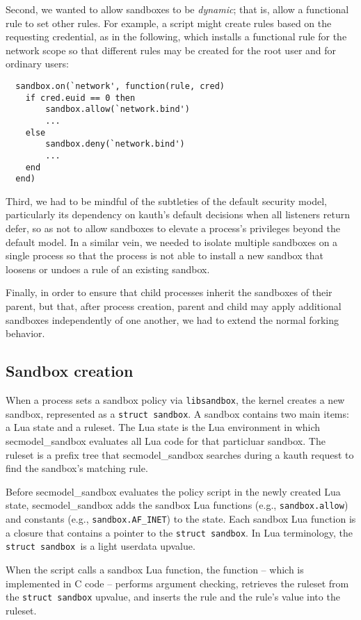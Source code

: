 \documentclass[letterpaper,twocolumn,9pt]{article}
\begin{document}
Second, we wanted to allow sandboxes to be \emph{dynamic}; that is, allow a
functional rule to set other rules.  For example, a script might create rules
based on the requesting credential, as in the following, which installs a
functional rule for the network scope so that different rules may be created
for the root user and for ordinary users:
\begin{verbatim}
  sandbox.on(`network', function(rule, cred)
    if cred.euid == 0 then
        sandbox.allow(`network.bind')
        ...
    else
        sandbox.deny(`network.bind')
        ...
    end
  end)
\end{verbatim}

Third, we had to be mindful of the subtleties of the default security model,
particularly its dependency on kauth's default decisions when all listeners
return defer, so as not to allow sandboxes to elevate a process's privileges
beyond the default model.  In a similar vein, we needed to isolate multiple
sandboxes on a single process so that the process is not able to install a new
sandbox that loosens or undoes a rule of an existing sandbox.

Finally, in order to ensure that child processes inherit the sandboxes of their
parent, but that, after process creation, parent and child may apply additional
sandboxes independently of one another, we had to extend the normal forking
behavior.

\subsection{Sandbox creation}
When a process sets a sandbox policy via \texttt{libsandbox}, the kernel
creates a new sandbox, represented as a \texttt{struct sandbox}. A sandbox
contains two main items: a Lua state and a ruleset.  The Lua state is the Lua
environment in which secmodel\_sandbox evaluates all Lua code for that
particluar sandbox.  The ruleset is a prefix tree that secmodel\_sandbox
searches during a kauth request to find the sandbox's matching rule. 

Before secmodel\_sandbox evaluates the policy script in the newly created Lua
state, secmodel\_sandbox adds the sandbox Lua functions (e.g.,
\texttt{sandbox.allow}) and constants (e.g., \texttt{sandbox.AF\_INET}) to the
state.  Each sandbox Lua function is a closure that contains a pointer to the
\texttt{struct sandbox}.  In Lua terminology, the \texttt{struct sandbox }is a
light userdata upvalue.  

When the script calls a sandbox Lua function, the function -- which is
implemented in C code -- performs argument checking, retrieves the ruleset from
the \texttt{struct sandbox} upvalue, and inserts the rule and the rule's value
into the ruleset.  
\end{document}
